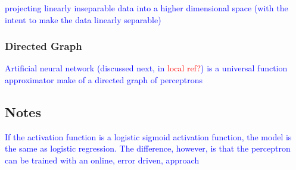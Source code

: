 \textcolor{blue}{projecting linearly inseparable data into a higher dimensional space (with the intent to make the data linearly separable)}

\subsubsection{Directed Graph}

\textcolor{blue}{Artificial neural network (discussed next, in \textcolor{red}{local ref?}) is a universal function approximator make of a directed graph of perceptrons}

\subsection{Notes}

\textcolor{blue}{If the activation function is a logistic sigmoid activation function, the model is the same as logistic regression.  The difference, however, is that the perceptron can be trained with an online, error driven, approach}